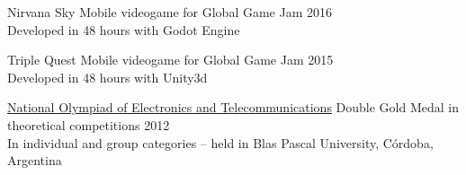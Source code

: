 \documentclass[10pt,a4paper]{article}
\begin{document}
\vspace{0.2em}
\headedsection
    { Nirvana Sky \href{http://globalgamejam.org/2016/games/nirvana-sky}{\ExternalLink} }
    { \textsc{} }{
    \headedsubsection
        { Mobile videogame for Global Game Jam }
        { 2016 }
        { \\ Developed in 48 hours with Godot Engine }
}

\vspace{0.2em}
\headedsection
    { Triple Quest \href{http://globalgamejam.org/2015/games/triple-quest}{\ExternalLink} }
    { \textsc{} }{
    \headedsubsection
        { Mobile videogame for Global Game Jam }
        { 2015 }
        { \\ Developed in 48 hours with Unity3d }
}

\vspace{0.2em}
\headedsection
    { \href{}{National Olympiad of Electronics and Telecommunications} }
    { \textsc{} }{
    \headedsubsection
        { Double Gold Medal in theoretical competitions }
        { 2012 }
        { \\ In individual and group categories -- held in Blas Pascal University, Córdoba, Argentina }
}
\fi
\end{document}
